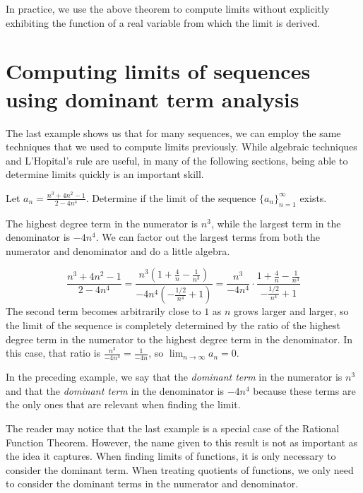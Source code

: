 \documentclass{ximera}
\begin{document}
In practice, we use the above theorem to compute limits without explicitly exhibiting the function of a real variable from which the limit is derived.  

\section{Computing limits of sequences using dominant term analysis}
The last example shows us that for many sequences, we can employ the same techniques that we used to compute limits previously.  While algebraic techniques and L'Hopital's rule are useful, in many of the following sections, being able to determine limits quickly is an important skill.    

\begin{example}
Let $a_n = \frac{n^3+4n^2-1}{2-4n^4}$.  Determine if the limit of the sequence $\{a_n\}_{n=1}^{\infty}$ exists.

\begin{explanation}
The highest degree term in the numerator is $n^3$, while the largest term in the denominator is $-4n^4$.  We can factor out the largest terms from both the numerator and denominator and do a little algebra.

\[
\frac{n^3+4n^2-1}{2-4n^4} = \frac{n^3\left(1+\frac{4}{n}-\frac{1}{n^3}\right)}{-4n^4\left(-\frac{1/2}{n^4}+1\right)} = \frac{n^3}{-4n^4} \cdot  \frac{1+\frac{4}{n}-\frac{1}{n^3}}{-\frac{1/2}{n^4}+1}
\]
The second term becomes arbitrarily close to $1$ as $n$ grows larger and larger, so the limit of the sequence is completely determined by the ratio of the highest degree term in the numerator to the highest degree term in the denominator.  In this case, that ratio is $\frac{n^3}{-4n^4} = \frac{1}{-4n}$, so $\lim_{n \to \infty} a_n = 0$.

\end{explanation}
\end{example}

In the preceding example, we say that the \emph{dominant term} in the numerator is $n^3$ and that the \emph{dominant term} in the denominator is $-4n^4$ because these terms are the only ones that are relevant when finding the limit.

\begin{remark}
The reader may notice that the last example is a special case of the Rational Function Theorem.  However, the name given to this result is not as important as the idea it captures.  When finding limits of functions, it is only necessary to consider the dominant term.  When treating quotients of functions, we only need to consider the dominant terms in the numerator and denominator.
\end{remark}
\end{document}
